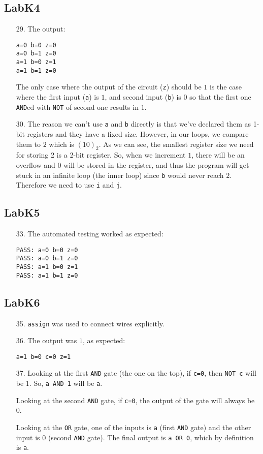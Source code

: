 \documentclass{article}
\begin{document}
\subsection{LabK4}
\begin{enumerate}
\item[29. ] The output:
\begin{verbatim}
a=0 b=0 z=0
a=0 b=1 z=0
a=1 b=0 z=1
a=1 b=1 z=0
\end{verbatim}
The only case where the output of the circuit (\verb$z$) should be $1$ is the case where the first input (\verb$a$) is $1$, and second input (\verb$b$) is $0$ so that the first one \verb$AND$ed with \verb$NOT$ of second one results in $1$.

\item[30. ] The reason we can't use \verb$a$ and \verb$b$ directly is that we've declared them as 1-bit registers and they have a fixed size. However, in our loops, we compare them to $2$ which is $(10)_2$. As we can see, the smallest register size we need for storing 2 is a 2-bit register. So, when we increment $1$, there will be an overflow and $0$ will be stored in the register, and thus the program will get stuck in an infinite loop (the inner loop) since \verb$b$ would never reach $2$. Therefore we need to use \verb$i$ and \verb$j$.
\end{enumerate}

\subsection{LabK5}
\begin{enumerate}
\item[33. ] The automated testing worked as expected:
\begin{verbatim}
PASS: a=0 b=0 z=0
PASS: a=0 b=1 z=0
PASS: a=1 b=0 z=1
PASS: a=1 b=1 z=0
\end{verbatim}
\end{enumerate}

\subsection{LabK6}
\begin{enumerate}
\item[35. ] \verb$assign$ was used to connect wires explicitly.

\item[36. ] The output was $1$, as expected:
\begin{verbatim}
a=1 b=0 c=0 z=1
\end{verbatim}

\item[37.] Looking at the first \verb$AND$ gate (the one on the top), if \verb$c=0$, then \verb$NOT c$ will be 1. So, \verb$a AND 1$ will be \verb$a$.

Looking at the second \verb$AND$ gate, if \verb$c=0$, the output of the gate will always be 0.

Looking at the \verb$OR$ gate, one of the inputs is \verb$a$ (first \verb$AND$ gate) and the other input is 0 (second \verb$AND$ gate). The final output is \verb$a OR 0$, which by definition is \verb$a$.
\end{enumerate}
\end{document}
